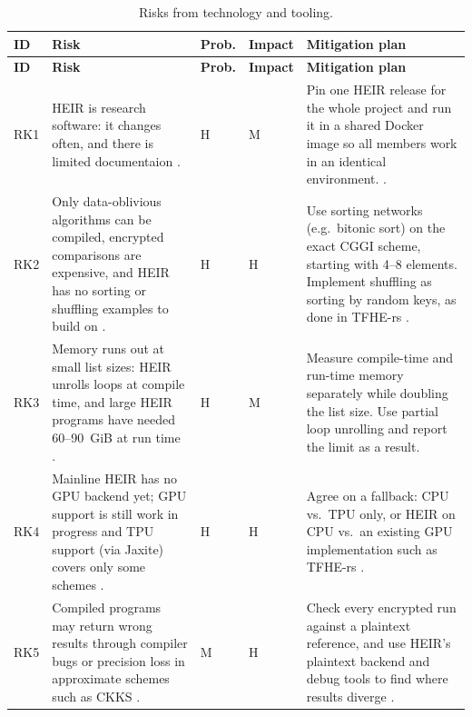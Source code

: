 \begingroup
\small
\renewcommand{\arraystretch}{1.25}
\begin{longtable}{
  >{\raggedright\arraybackslash}p{}
  >{\raggedright\arraybackslash}p{}
  >{\centering\arraybackslash}p{}
  >{\centering\arraybackslash}p{}
  >{\raggedright\arraybackslash}p{}}
\caption{Risks from technology and tooling.}\label{tab:risk-tech}\\
\toprule
\textbf{ID} & \textbf{Risk} & \textbf{Prob.} & \textbf{Impact} & \textbf{Mitigation plan}\\
\midrule
\endfirsthead
\toprule
\textbf{ID} & \textbf{Risk} & \textbf{Prob.} & \textbf{Impact} & \textbf{Mitigation plan}\\
\midrule
\endhead
\bottomrule
\endfoot
 
RK1 &
HEIR is research software: it changes often, and there is limited documentaion \cite{Goo26, Kun26}. &
H & M &
Pin one HEIR release for the whole project and run it in a shared Docker image so all members work in an identical environment.
\cite{Goo26}.
\\ \midrule
 
RK2 &
Only data-oblivious algorithms can be compiled, encrypted comparisons are
expensive, and HEIR has no sorting or shuffling examples to build on
\cite{ali2025heir, Goo26}. &
H & H &
Use sorting networks (e.g.\ bitonic sort) on the exact CGGI scheme, starting
with 4--8 elements. Implement shuffling as sorting by random keys, as done
in TFHE-rs \cite{Zam26}.
\\ \midrule
 
RK3 &
Memory runs out at small list sizes: HEIR unrolls loops at compile time, and
large HEIR programs have needed 60--90~GiB at run time
\cite{ali2025heir, Kun26}. &
H & M &
Measure compile-time and run-time memory separately while doubling the list
size. Use partial loop unrolling and report the limit as a result.
\\ \midrule
 
RK4 &
Mainline HEIR has no GPU backend yet; GPU support is still work in progress
and TPU support (via Jaxite) covers only some schemes
\cite{Goo26, Kun26}. &
H & H &
Agree on a fallback: CPU vs.\ TPU only, or
HEIR on CPU vs.\ an existing GPU implementation such as TFHE-rs
\cite{Zam26}.
\\ \midrule
 
RK5 &
Compiled programs may return wrong results through compiler bugs or
precision loss in approximate schemes such as CKKS
\cite{ali2025heir, Kun26}. &
M & H &
Check every encrypted run against a plaintext reference, and use HEIR's
plaintext backend and debug tools to find where results diverge
\cite{ali2025heir}.
\\
\end{longtable}
\endgroup

